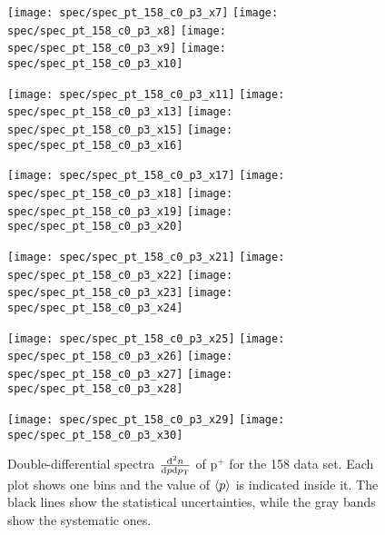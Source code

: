 \begin{figure}[!ht]
  \centering

  \texttt{[image: spec/spec\_pt\_158\_c0\_p3\_x7]}
  \texttt{[image: spec/spec\_pt\_158\_c0\_p3\_x8]}
  \texttt{[image: spec/spec\_pt\_158\_c0\_p3\_x9]}
  \texttt{[image: spec/spec\_pt\_158\_c0\_p3\_x10]}

  \texttt{[image: spec/spec\_pt\_158\_c0\_p3\_x11]}
  \texttt{[image: spec/spec\_pt\_158\_c0\_p3\_x13]}
  \texttt{[image: spec/spec\_pt\_158\_c0\_p3\_x15]}
  \texttt{[image: spec/spec\_pt\_158\_c0\_p3\_x16]}

  \texttt{[image: spec/spec\_pt\_158\_c0\_p3\_x17]}
  \texttt{[image: spec/spec\_pt\_158\_c0\_p3\_x18]}
  \texttt{[image: spec/spec\_pt\_158\_c0\_p3\_x19]}
  \texttt{[image: spec/spec\_pt\_158\_c0\_p3\_x20]}

  \texttt{[image: spec/spec\_pt\_158\_c0\_p3\_x21]}
  \texttt{[image: spec/spec\_pt\_158\_c0\_p3\_x22]}
  \texttt{[image: spec/spec\_pt\_158\_c0\_p3\_x23]}
  \texttt{[image: spec/spec\_pt\_158\_c0\_p3\_x24]}

  \texttt{[image: spec/spec\_pt\_158\_c0\_p3\_x25]}
  \texttt{[image: spec/spec\_pt\_158\_c0\_p3\_x26]}
  \texttt{[image: spec/spec\_pt\_158\_c0\_p3\_x27]}
  \texttt{[image: spec/spec\_pt\_158\_c0\_p3\_x28]}

  \texttt{[image: spec/spec\_pt\_158\_c0\_p3\_x29]}
  \texttt{[image: spec/spec\_pt\_158\_c0\_p3\_x30]}

  \caption{Double-differential spectra $\frac{\text{d}^2n}{\text{d}p\text{d}p_\text{T}}$
    of p$^+$ for the 158 \GeVc data set. Each plot shows one \pp bins and the value
    of $\langle p\rangle$ is indicated inside it. The black lines show the statistical
    uncertainties, while the gray bands show the systematic ones.}
  \label{fig:hadron:spec:dedx:all158:c0p3}
\end{figure}

